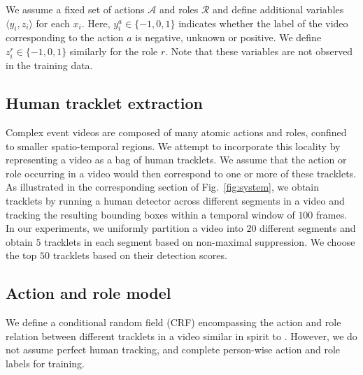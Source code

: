 \documentclass[10pt,twocolumn,letterpaper]{article}
\begin{document}
We assume a fixed set of actions $\mathcal{A}$ and roles $\mathcal{R}$ and define additional variables $\langle y_i, z_i \rangle$ for each $x_i$. 
Here, $y_i^a \in \{-1,0,1\}$ indicates whether the label of the video corresponding
to the action $a$ is negative, unknown or positive. We define $z_i^r \in \{-1,0,1\}$ similarly for the role $r$. 
Note that these variables are not observed in the training data.


\subsection{Human tracklet extraction}
Complex event videos are composed of many atomic actions and roles, 
confined to smaller spatio-temporal regions. 
We attempt to incorporate this locality by representing a video as a bag of human tracklets. 
We assume that the action or role occurring in a video would then correspond to one or more of these tracklets. 
As illustrated in the corresponding section of Fig.~\ref{fig:system}, 
we obtain tracklets by running a human detector \cite{Felzenszwalb_PAMI10} across different segments in a video 
and tracking the resulting bounding boxes within a temporal window of $100$ frames. 
In our experiments, we uniformly partition a video into $20$ different segments and obtain $5$ tracklets in each segment 
based on non-maximal suppression. We choose the top $50$ tracklets based on their detection scores.

\subsection{Action and role model}\label{sec:model_features}
We define a conditional random field (CRF) encompassing the action and role relation between different tracklets
in a video similar in spirit to \cite{Lan_CVPR12}. 
However, we do not assume perfect human tracking, 
and complete person-wise action and role labels for training. 
\end{document}
